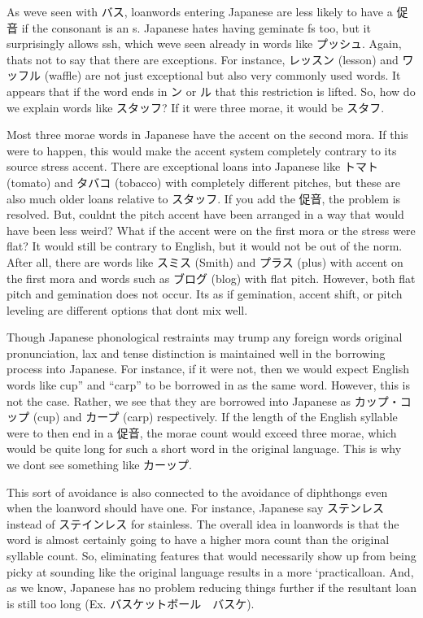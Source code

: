 \par{ As we\textquotesingle ve seen with バス, loanwords entering Japanese are less likely to have a 促音 if the consonant is an s. Japanese hates having geminate f\textquotesingle s too, but it surprisingly allows ssh, which we\textquotesingle ve seen already in words like プッシュ. Again, that\textquotesingle s not to say that there are exceptions. For instance, レッスン (lesson) and ワッフル (waffle) are not just exceptional but also very commonly used words. It appears that if the word ends in ン or ル that this restriction is lifted. So, how do we explain words like スタッフ? If it were three morae, it would be スタフ. }

\par{ Most three morae words in Japanese have the accent on the second mora. If this were to happen, this would make the accent system completely contrary to its source stress accent. There are exceptional loans into Japanese like トマト (tomato) and タバコ (tobacco) with completely different pitches, but these are also much older loans relative to スタッフ. If you add the 促音, the problem is resolved. But, couldn\textquotesingle t the pitch accent have been arranged in a way that would have been less weird? What if the accent were on the first mora or the stress were flat? It would still be contrary to English, but it would not be out of the norm. After all, there are words like スミス (Smith) and プラス (plus) with accent on the first mora and words such as ブログ (blog) with flat pitch. However, both flat pitch and gemination does not occur. It\textquotesingle s as if gemination, accent shift, or pitch leveling are different options that don\textquotesingle t mix well. }

\par{ Though Japanese phonological restraints may trump any foreign word\textquotesingle s original pronunciation, lax and tense distinction is maintained well in the borrowing process into Japanese. For instance, if it were not, then we would expect English words like cup” and “carp” to be borrowed in as the same word. However, this is not the case. Rather, we see that they are borrowed into Japanese as カップ・コップ (cup) and カープ (carp) respectively. If the length of the English syllable were to then end in a 促音, the morae count would exceed three morae, which would be quite long for such a short word in the original language. This is why we don\textquotesingle t see something like カーップ. }

\par{ This sort of avoidance is also connected to the avoidance of diphthongs even when the loanword should have one. For instance, Japanese say ステンレス instead of ステインレス for stainless. The overall idea in loanwords is that the word is almost certainly going to have a higher mora count than the original syllable count. So, eliminating features that would necessarily show up from being picky at sounding like the original language results in a more ‘practical\textquotesingle  loan. And, as we know, Japanese has no problem reducing things further if the resultant loan is still too long (Ex. バスケットボール　\textrightarrow  バスケ). }

